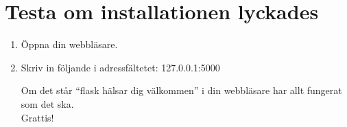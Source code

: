\documentclass{TDP003mall}
\begin{document}
\section{Testa om installationen lyckades}

\begin{enumerate}
  \item Öppna din webbläsare.
  \item Skriv in följande i adressfältetet: 127.0.0.1:5000

Om det står ``flask hälsar dig välkommen'' i din webbläsare har allt fungerat som det ska.\\
Grattis!
\end{enumerate}
\end{document}
